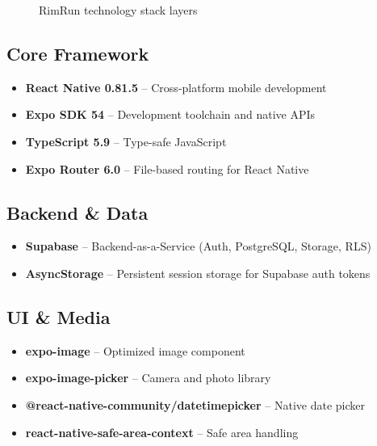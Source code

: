 \documentclass[11pt,a4paper]{article}
\begin{document}
\begin{figure}[h]
\centering
{}
\caption{RimRun technology stack layers}
\end{figure}

\subsection{Core Framework}
\begin{itemize}
    \item \textbf{React Native 0.81.5} -- Cross-platform mobile development
    \item \textbf{Expo SDK 54} -- Development toolchain and native APIs
    \item \textbf{TypeScript 5.9} -- Type-safe JavaScript
    \item \textbf{Expo Router 6.0} -- File-based routing for React Native
\end{itemize}

\subsection{Backend \& Data}
\begin{itemize}
    \item \textbf{Supabase} -- Backend-as-a-Service (Auth, PostgreSQL, Storage, RLS)
    \item \textbf{AsyncStorage} -- Persistent session storage for Supabase auth tokens
\end{itemize}

\subsection{UI \& Media}
\begin{itemize}
    \item \textbf{expo-image} -- Optimized image component
    \item \textbf{expo-image-picker} -- Camera and photo library
    \item \textbf{@react-native-community/datetimepicker} -- Native date picker
    \item \textbf{react-native-safe-area-context} -- Safe area handling
\end{itemize}
\end{document}

